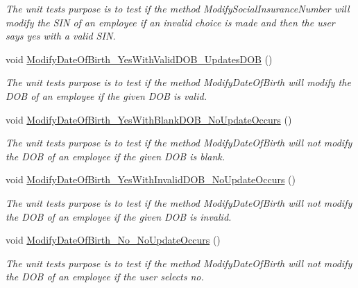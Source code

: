 \begin{DoxyCompactItemize}
\begin{DoxyCompactList}\small\item\em The unit test\textquotesingle{}s purpose is to test if the method Modify\+Social\+Insurance\+Number will modify the S\+I\+N of an employee if an invalid choice is made and then the user says yes with a valid S\+I\+N. \end{DoxyCompactList}\item 
void \hyperlink{class_the_company_1_1_tests_1_1_modify_employee_tests_a8bee0163fb7a605a390dfc3e67a32df4}{Modify\+Date\+Of\+Birth\+\_\+\+Yes\+With\+Valid\+D\+O\+B\+\_\+\+Updates\+D\+O\+B} ()
\begin{DoxyCompactList}\small\item\em The unit test\textquotesingle{}s purpose is to test if the method Modify\+Date\+Of\+Birth will modify the D\+O\+B of an employee if the given D\+O\+B is valid. \end{DoxyCompactList}\item 
void \hyperlink{class_the_company_1_1_tests_1_1_modify_employee_tests_abd2410453706ac71f0ba135ef5b36ab4}{Modify\+Date\+Of\+Birth\+\_\+\+Yes\+With\+Blank\+D\+O\+B\+\_\+\+No\+Update\+Occurs} ()
\begin{DoxyCompactList}\small\item\em The unit test\textquotesingle{}s purpose is to test if the method Modify\+Date\+Of\+Birth will not modify the D\+O\+B of an employee if the given D\+O\+B is blank. \end{DoxyCompactList}\item 
void \hyperlink{class_the_company_1_1_tests_1_1_modify_employee_tests_a3dce10814fec36ffb9e17992c44a3710}{Modify\+Date\+Of\+Birth\+\_\+\+Yes\+With\+Invalid\+D\+O\+B\+\_\+\+No\+Update\+Occurs} ()
\begin{DoxyCompactList}\small\item\em The unit test\textquotesingle{}s purpose is to test if the method Modify\+Date\+Of\+Birth will not modify the D\+O\+B of an employee if the given D\+O\+B is invalid. \end{DoxyCompactList}\item 
void \hyperlink{class_the_company_1_1_tests_1_1_modify_employee_tests_a2afe1ec07f7f5cbf6c0265a40dc5c2bd}{Modify\+Date\+Of\+Birth\+\_\+\+No\+\_\+\+No\+Update\+Occurs} ()
\begin{DoxyCompactList}\small\item\em The unit test\textquotesingle{}s purpose is to test if the method Modify\+Date\+Of\+Birth will not modify the D\+O\+B of an employee if the user selects no. \end{DoxyCompactList}\item 

\end{DoxyCompactItemize}
